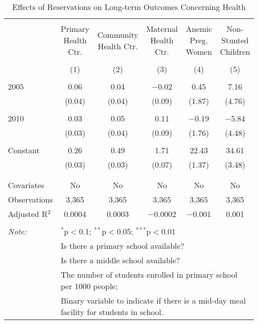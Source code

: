 
\begin{table}[!htbp] \centering 
  \caption{Effects of Reservations on Long-term Outcomes Concerning Health} 
  \label{raj_shrug_health_05_10} 
\scriptsize 
\begin{tabular}{@{\extracolsep{5pt}}lccccc} 
\\[-1.8ex]\hline 
\hline \\[-1.8ex] 
 & Primary Health Ctr. & Community Health Ctr. & Maternal Health Ctr. & Anemic Preg. Women & Non-Stunted Children \\ 
\\[-1.8ex] & (1) & (2) & (3) & (4) & (5)\\ 
\hline \\[-1.8ex] 
 2005 & 0.06 & 0.04 & $-$0.02 & 0.45 & 7.16 \\ 
  & (0.04) & (0.04) & (0.09) & (1.87) & (4.76) \\ 
  & & & & & \\ 
 2010 & 0.03 & 0.05 & 0.11 & $-$0.19 & $-$5.84 \\ 
  & (0.03) & (0.04) & (0.09) & (1.76) & (4.48) \\ 
  & & & & & \\ 
 Constant & 0.26 & 0.49 & 1.71 & 22.43 & 34.61 \\ 
  & (0.03) & (0.03) & (0.07) & (1.37) & (3.48) \\ 
  & & & & & \\ 
\hline \\[-1.8ex] 
Covariates & No & No & No & No & No \\ 
Observations & 3,365 & 3,365 & 3,365 & 3,365 & 3,365 \\ 
Adjusted R$^{2}$ & 0.0004 & 0.0003 & $-$0.0002 & $-$0.001 & 0.001 \\ 
\hline 
\hline \\[-1.8ex] 
\textit{Note:}  & \multicolumn{5}{l}{$^{*}$p$<$0.1; $^{**}$p$<$0.05; $^{***}$p$<$0.01} \\ 
 & \multicolumn{5}{l}{Is there a primary school available?} \\ 
 & \multicolumn{5}{l}{Is there a middle school available?} \\ 
 & \multicolumn{5}{l}{The number of students enrolled in primary school per 1000 people;} \\ 
 & \multicolumn{5}{l}{Binary variable to indicate if there is a mid-day meal facility for students in school.} \\ 
\end{tabular} 
\end{table} 
